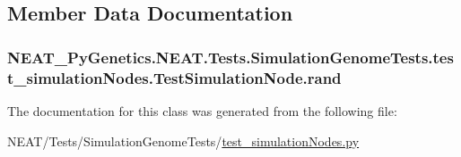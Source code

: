 \subsection{Member Data Documentation}
\subsubsection[{\texorpdfstring{rand}{rand}}]{\setlength{\rightskip}{0pt plus 5cm}N\+E\+A\+T\+\_\+\+Py\+Genetics.\+N\+E\+A\+T.\+Tests.\+Simulation\+Genome\+Tests.\+test\+\_\+simulation\+Nodes.\+Test\+Simulation\+Node.\+rand}\hypertarget{classNEAT__PyGenetics_1_1NEAT_1_1Tests_1_1SimulationGenomeTests_1_1test__simulationNodes_1_1TestSimulationNode_a58ee9548720e0cbc77056697727a0e74}{}\label{classNEAT__PyGenetics_1_1NEAT_1_1Tests_1_1SimulationGenomeTests_1_1test__simulationNodes_1_1TestSimulationNode_a58ee9548720e0cbc77056697727a0e74}


The documentation for this class was generated from the following file\+:\begin{DoxyCompactItemize}
\item 
N\+E\+A\+T/\+Tests/\+Simulation\+Genome\+Tests/\hyperlink{test__simulationNodes_8py}{test\+\_\+simulation\+Nodes.\+py}\end{DoxyCompactItemize}
